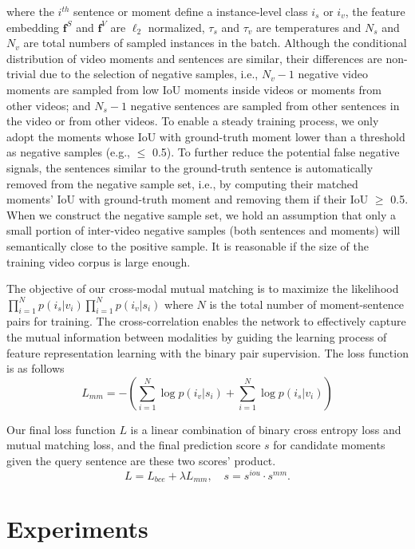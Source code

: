 \documentclass[letterpaper]{article} \usepackage{aaai22}  \usepackage{times}  \usepackage{helvet}  \usepackage{courier}  \usepackage[hyphens]{url}  \usepackage{graphicx} \urlstyle{rm} \def\UrlFont{\rm}  \usepackage{natbib}  \usepackage{caption} \DeclareCaptionStyle{ruled}{labelfont=normalfont,labelsep=colon,strut=off} \frenchspacing  \setlength{\pdfpagewidth}{8.5in}  \setlength{\pdfpageheight}{11in}  \usepackage{algorithm}
\begin{document}
where the $i^{th}$ sentence or moment define a instance-level class $i_s$ or $i_v$, the feature embedding $\mathbf{f}^S$ and $\mathbf{f}^V$ are $\ell_2$ normalized, $\tau_s$ and $\tau_v$ are temperatures and $N_s$ and $N_v$ are total numbers of sampled instances in the batch. Although the conditional distribution of video moments and sentences are similar, their differences are non-trivial due to the selection of negative samples, i.e., $N_v-1$ negative video moments are sampled from low IoU moments inside videos or moments from other videos; and $N_s-1$ negative sentences are sampled from other sentences in the video or from other videos. To enable a steady training process, we only adopt the moments whose IoU with ground-truth moment lower than a threshold as negative samples (e.g., $\leq$ 0.5). To further reduce the potential false negative signals, the sentences similar to the ground-truth sentence is automatically removed from the negative sample set, i.e., by computing their matched moments' IoU with ground-truth moment and removing them if their IoU $\geq$ 0.5. When we construct the negative sample set, we hold an assumption that only a small portion of inter-video negative samples (both sentences and moments) will semantically close to the positive sample. It is reasonable if the size of the training video corpus is large enough.

The objective of our cross-modal mutual matching is to maximize the likelihood $\prod^{N}_{i=1}p(i_s|v_i)\prod^{N}_{i=1}p(i_v|s_i)$ where $N$ is the total number of moment-sentence pairs for training. The cross-correlation enables the network to effectively capture the mutual information between modalities by guiding the learning process of feature representation learning with the binary pair supervision. The loss function is as follows
\begin{equation}
L_{mm} = - \left( \sum_{i=1}^{N} \log p(i_v|s_i) + \sum_{i=1}^{N} \log p(i_s|v_i)\right)
\end{equation}


Our final loss function $L$ is a linear combination of binary cross entropy loss and mutual matching loss, and the final prediction score $s$ for candidate moments given the query sentence are these two scores' product.
\begin{equation}
L = L_{bce} + \lambda L_{mm}, \quad s = s^{iou} \cdot s^{mm}.
\end{equation}

\section{Experiments}
\end{document}
